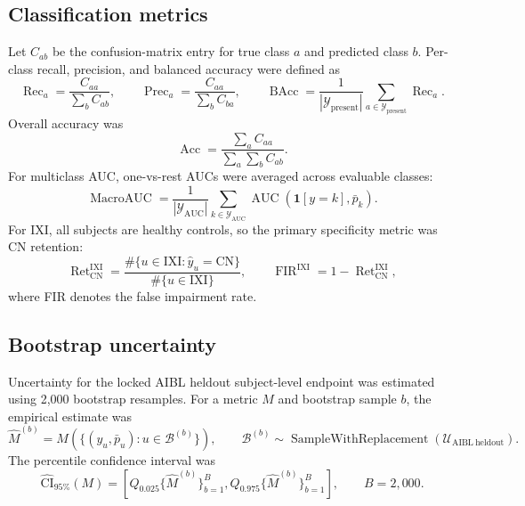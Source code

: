 \documentclass[12pt,a4paper]{article}
\begin{document}
\subsection{Classification metrics}
\label{sec:metrics}

Let $C_{ab}$ be the confusion-matrix entry for true class $a$ and predicted class $b$. Per-class recall, precision, and balanced accuracy were defined as
\begin{equation}
\operatorname{Rec}_a =
\frac{C_{aa}}{\sum_b C_{ab}},
\qquad
\operatorname{Prec}_a =
\frac{C_{aa}}{\sum_b C_{ba}},
\qquad
\operatorname{BAcc} =
\frac{1}{|\mathcal{Y}_{\mathrm{present}}|}
\sum_{a\in\mathcal{Y}_{\mathrm{present}}}\operatorname{Rec}_a .
\label{eq:metrics}
\end{equation}
Overall accuracy was
\begin{equation}
\operatorname{Acc}=
\frac{\sum_a C_{aa}}{\sum_a\sum_b C_{ab}}.
\label{eq:accuracy}
\end{equation}
For multiclass AUC, one-vs-rest AUCs were averaged across evaluable classes:
\begin{equation}
\operatorname{MacroAUC}=
\frac{1}{|\mathcal{Y}_{\mathrm{AUC}}|}
\sum_{k\in\mathcal{Y}_{\mathrm{AUC}}}
\operatorname{AUC}
\left(\mathbf{1}[y=k],\bar{p}_{k}\right).
\label{eq:macro_auc}
\end{equation}
For IXI, all subjects are healthy controls, so the primary specificity metric was CN retention:
\begin{equation}
\operatorname{Ret}^{\mathrm{IXI}}_{\mathrm{CN}}
=
\frac{\#\{u\in\mathrm{IXI}:\hat{y}_u=\mathrm{CN}\}}
{\#\{u\in\mathrm{IXI}\}},
\qquad
\operatorname{FIR}^{\mathrm{IXI}}=1-\operatorname{Ret}^{\mathrm{IXI}}_{\mathrm{CN}},
\label{eq:ixi_retention}
\end{equation}
where FIR denotes the false impairment rate.

\subsection{Bootstrap uncertainty}
\label{sec:bootstrap}

Uncertainty for the locked AIBL heldout subject-level endpoint was estimated using 2{,}000 bootstrap resamples. For a metric $M$ and bootstrap sample $b$, the empirical estimate was
\begin{equation}
\hat{M}^{(b)}
=
M\left(\{(y_u,\bar{p}_u):u\in\mathcal{B}^{(b)}\}\right),
\qquad
\mathcal{B}^{(b)}
\sim
\operatorname{SampleWithReplacement}(\mathcal{U}_{\mathrm{AIBL\ heldout}}).
\label{eq:bootstrap}
\end{equation}
The percentile confidence interval was
\begin{equation}
\widehat{\mathrm{CI}}_{95\%}(M)
=
\left[
Q_{0.025}\{\hat{M}^{(b)}\}_{b=1}^{B},
Q_{0.975}\{\hat{M}^{(b)}\}_{b=1}^{B}
\right],
\qquad B=2{,}000 .
\label{eq:bootstrap_ci}
\end{equation}
\end{document}
